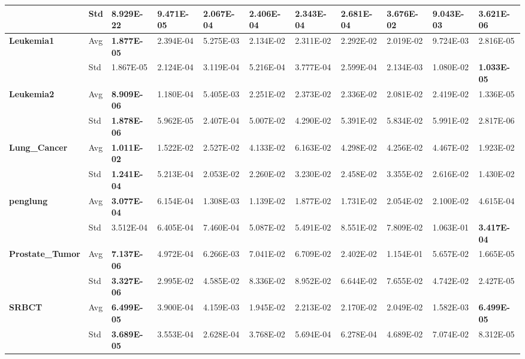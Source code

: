 \documentclass{article} %
\begin{document}
\begin{tabular}{|p{0.6in}|p{0.3in}|p{0.4in}|p{0.4in}|p{0.4in}|p{0.4in}|p{0.4in}|p{0.4in}|p{0.4in}|p{0.4in}|p{0.4in}|}
\textbf{} & Std & \textbf{8.929E-22} & 9.471E-05 & 2.067E-04 & 2.406E-04 & 2.343E-04 & 2.681E-04 & 3.676E-02 & 9.043E-03 & 3.621E-06 \\ \hline 
\textbf{Leukemia1} & Avg & \textbf{1.877E-05} & 2.394E-04 & 5.275E-03 & 2.134E-02 & 2.311E-02 & 2.292E-02 & 2.019E-02 & 9.724E-03 & 2.816E-05 \\ \hline 
\textbf{} & Std & 1.867E-05\textbf{} & 2.124E-04 & 3.119E-04 & 5.216E-04 & 3.777E-04 & 2.599E-04 & 2.134E-03 & 1.080E-02 & \textbf{1.033E-05} \\ \hline 
\textbf{Leukemia2} & Avg & \textbf{8.909E-06} & 1.180E-04\textbf{} & 5.405E-03 & 2.251E-02 & 2.373E-02\textbf{} & 2.336E-02 & 2.081E-02 & 2.419E-02 & 1.336E-05 \\ \hline 
\textbf{} & Std & \textbf{1.878E-06} & 5.962E-05\textbf{} & 2.407E-04 & 5.007E-02 & 4.290E-02\textbf{} & 5.391E-02 & 5.834E-02 & 5.991E-02 & 2.817E-06 \\ \hline 
\textbf{Lung\_Cancer} & Avg & \textbf{1.011E-02} & 1.522E-02 & 2.527E-02 & 4.133E-02 & 6.163E-02\textbf{} & 4.298E-02 & 4.256E-02 & 4.467E-02 & 1.923E-02 \\ \hline 
\textbf{} & Std & \textbf{1.241E-04} & 5.213E-04 & 2.053E-02 & 2.260E-02 & 3.230E-02\textbf{} & 2.458E-02 & 3.355E-02 & 2.616E-02 & 1.430E-02 \\ \hline 
\textbf{penglung} & Avg & \textbf{3.077E-04} & 6.154E-04\textbf{} & 1.308E-03\textbf{} & 1.139E-02 & 1.877E-02 & 1.731E-02 & 2.054E-02\textbf{} & 2.100E-02 & 4.615E-04 \\ \hline 
\textbf{} & Std & 3.512E-04 & 6.405E-04\textbf{} & 7.460E-04\textbf{} & 5.087E-02 & 5.491E-02 & 8.551E-02 & 7.809E-02\textbf{} & 1.063E-01 & \textbf{3.417E-04} \\ \hline 
\textbf{Prostate\_Tumor} & Avg & \textbf{7.137E-06} & 4.972E-04 & 6.266E-03 & 7.041E-02 & 6.709E-02\textbf{} & 2.402E-02 & 1.154E-01\textbf{} & 5.657E-02 & 1.665E-05 \\ \hline 
\textbf{} & Std & \textbf{3.327E-06} & 2.995E-02 & 4.585E-02 & 8.336E-02 & 8.952E-02\textbf{} & 6.644E-02 & 7.655E-02\textbf{} & 4.742E-02 & 2.427E-05 \\ \hline 
\textbf{SRBCT} & Avg & \textbf{6.499E-05} & 3.900E-04 & 4.159E-03 & 1.945E-02 & 2.213E-02\textbf{} & 2.170E-02 & 2.049E-02\textbf{} & 1.582E-03 & \textbf{6.499E-05} \\ \hline 
\textbf{} & Std & \textbf{3.689E-05} & 3.553E-04 & 2.628E-04 & 3.768E-02 & 5.694E-04\textbf{} & 6.278E-04 & 4.689E-02\textbf{} & 7.074E-02 & 8.312E-05 \\ \hline 
\end{tabular}
\end{document}

